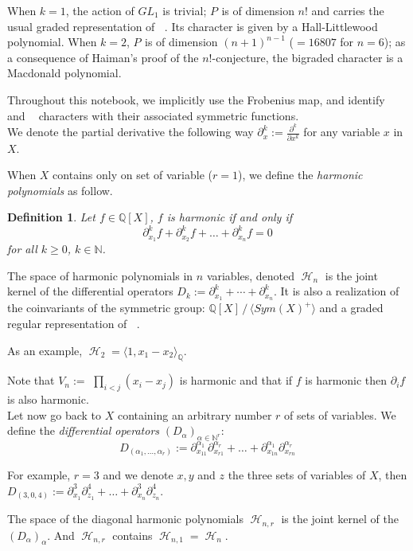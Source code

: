 \documentclass[letter,12pt]{article}
\newcommand{\NN}{\mathbb{N}}
\newcommand{\QQ}{\mathbb{Q}}
\DeclareMathOperator{\Sn}{\mathbb{S}_n}
\DeclareMathOperator{\GLr}{GL_r}
\DeclareMathOperator{\harmonics}{\mathcal{H}}
\newtheorem{definition}{Definition}
\begin{document}
	When $k=1$, the action of $GL_1$ is trivial; $P_{\Sn}$ is of dimension $n!$ and carries the usual graded representation of $\Sn$. Its character is given by a Hall-Littlewood polynomial.
	When $k=2$, $P_{\Sn}$ is of dimension $(n+1)^{n-1}$ ($=16807$ for $n=6$); as a consequence of Haiman's proof of the $n!$-conjecture, the bigraded character is a Macdonald polynomial.
	
	Throughout this notebook, we implicitly use the Frobenius map, and identify $\Sn$ and $\GLr$ characters with their associated symmetric functions. \\
	
	We denote the partial derivative the following way $\partial^k_x := \frac{\partial^k}{\partial x^k}$ for any variable $x$ in $X$.
	
	When $X$ contains only on set of variable ($r=1$), we define the \emph{harmonic polynomials} as follow.
	
	\begin{definition}
		Let $f \in \QQ[X]$, $f$ is \emph{harmonic} if and only if
		$$\partial^k_{x_1} f + \partial^k_{x_2} f + \dots + \partial^k_{x_n} f = 0 $$
		for all $k \geq 0$, $k \in \NN$.
	\end{definition}

	The space of harmonic polynomials in $n$ variables, denoted $\harmonics_{n}$ is the joint kernel of the differential operators $D_k := \partial_{x_1}^k + \cdots + \partial_{x_n}^k$. It is also a realization of the coinvariants of the symmetric group: $\QQ[X]\, /\, \langle Sym(X)^+ \rangle$ and a graded regular representation of $\Sn$. 
	
	As an example, $\harmonics_2 = \langle 1, x_1-x_2 \rangle_\QQ$. 
	
	Note that $V_n:=$ $\prod_{i<j}(x_i-x_j)$ is harmonic and that if $f$ is harmonic then $\partial_i f$ is also harmonic. \\
	
	Let now go back to $X$ containing an arbitrary number $r$ of sets of variables.
	We define the \emph{differential operators} $(D_\alpha)_{\alpha\in \NN^r}$:
	$$D_{(\alpha_1, \dots, \alpha_r)} := \partial_{x_{11}}^{\alpha_1}\partial_{x_{r1}}^{\alpha_r} + \dots + \partial_{x_{1n}}^{\alpha_1}\partial_{x_{rn}}^{\alpha_r}$$
	
	For example, $r=3$ and we denote $x, y$ and $z$ the three sets of variables of $X$, then $D_{(3,0,4)} := \partial_{x_1}^3\partial_{z_1}^4 + \dots + \partial_{x_n}^3\partial_{z_n}^4$. 
	
	The space of the diagonal harmonic polynomials $\harmonics_{n,r}$ is the joint kernel of the $(D_\alpha)_\alpha$. And $\harmonics_{n,r}$ contains $\harmonics_{n,1} = \harmonics_{n}$. 
	
\end{document}
